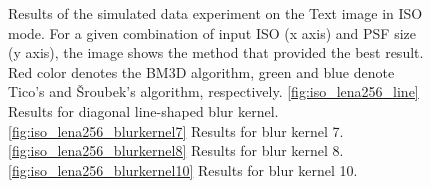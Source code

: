 \documentclass[12pt,notitlepage]{report}
\begin{document}
\begin{figure}[htb]
  \caption[Results for the text image in ISO mode]{Results of the simulated data experiment on the Text image in ISO mode. For a given combination of input ISO (x axis) and PSF size (y axis), the image shows the method that provided the best result. Red color denotes the BM3D algorithm, green and blue denote Tico's and Šroubek's algorithm, respectively. \ref{fig:iso_lena256_line} Results for diagonal line-shaped blur kernel. \ref{fig:iso_lena256_blurkernel7} Results for blur kernel 7. \ref{fig:iso_lena256_blurkernel8} Results for blur kernel 8. \ref{fig:iso_lena256_blurkernel10} Results for blur kernel 10.}
  \label{fig:iso_text256}
\end{figure}

\clearpage
\end{document}
